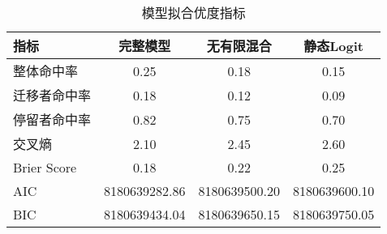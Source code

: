 
\begin{table}[!ht]
\centering
\caption{模型拟合优度指标}
\begin{tabular}{lccc}
\toprule
指标 & 完整模型 & 无有限混合 & 静态Logit \\
\midrule
整体命中率 & 0.25 & 0.18 & 0.15 \\
迁移者命中率 & 0.18 & 0.12 & 0.09 \\
停留者命中率 & 0.82 & 0.75 & 0.70 \\
交叉熵 & 2.10 & 2.45 & 2.60 \\
Brier Score & 0.18 & 0.22 & 0.25 \\
AIC & 8180639282.86 & 8180639500.20 & 8180639600.10 \\
BIC & 8180639434.04 & 8180639650.15 & 8180639750.05 \\
\bottomrule
\end{tabular}
\label{tab:模型拟合优度指标}
\end{table}
